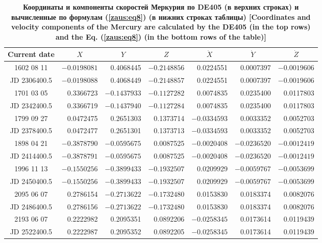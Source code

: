 \begin{table}
\begin{minipage}[t]{160mm}
\caption{\bf Координаты и компоненты скоростей Меркурия по DE405 (в верхних строках) и вычисленные по формулам  (\ref{zaus:eq8}) (в нижних строках таблицы) [Coordinates and velocity components of the Mercury are calculated by the  DE405 (in the top rows) and the Eq. (\ref{zaus:eq8}) (in the bottom rows of the table)]
\vspace{-3mm}}
\begin{tabular}{|c|r|r|r|r|r|r|}
\hline
\footnotesize
\rule{0mm}{12pt}%
Current date & \multicolumn{1}{c|}{\footnotesize $X$}&	\multicolumn{1}{c|}{\footnotesize $Y$}&	\multicolumn{1}{c|}{\footnotesize $Z$}&	\multicolumn{1}{c|}{\footnotesize $\dot{X}$}&	\multicolumn{1}{c|}{\footnotesize $\dot{Y}$}&	\multicolumn{1}{c|}{\footnotesize$\dot{Z}$}\\ \hline
\rule{0mm}{14pt}%
1602 08 11&	$-0.0198081$ &	0.4068445&	$-0.2148856$ &	0.0224551&	0.0007397&	  $-0.0019606$ \\
JD 2306400.5&	$-0.0198088$ &	0.4068449&	$-0.2148857$ &	0.0224551&	0.0007397&	  $-0.0019606$ \\ \hline
1701 03 05&	0.3366723&	$-0.1437933$ &	$-0.1127282$ &	0.0074835&	0.0235400&	   0.0117803 \\
JD 2342400.5&	0.3366719&	$-0.1437940$&	$-0.1127284$&	0.0074835&	0.0235400&	   0.0117803 \\ \hline
1799 09 27&	0.0472475&	0.2651303&	0.1373714&	$-0.0334593$ &	0.0033352&	   0.0052703\\
JD 2378400.5&	0.0472477&	0.2651301&	0.1373713&	$-0.0334593$ &	0.0033352&	   0.0052703\\ \hline
1898 04 21&	$-0.3878790$ &	$-0.0595675$ &	0.0087525&	$-0.0020408$ &	$-0.0236520$ &	  $-0.0012419$\\
JD 2414400.5&	$-0.3878791$&	$-0.0595675$&	0.0087525&	$-0.0020408$ &	$-0.0236520$&	  $-0.0012419$\\ \hline
1996 11 13&	$-0.1550256$ &	$-0.3899433$&	$-0.1932507$ &	0.0209929& 	$-0.0059767$ &	  $-0.0053699$ \\
JD 2450400.5&	$-0.1550256$&	$-0.3899433$&	$-0.1932507$&	0.0209929 &	$-0.0059767$ &	  $-0.0053699$\\ \hline
2095 06 07&	0.2786154&	$-0.2713622$&	$-0.1732480$&	 0.0153830 &	0.0183374 &	  0.0082076 \\
JD 2486400.5&	0.2786156&	$-0.2713622$&	$-0.1732480$&	 0.0153830 &	0.0183374 &	  0.0082076 \\ \hline
2193 06 07&	0.2222982&	0.2095351&	0.0892206&	 $-0.0258345$& 	0.0173614&	  0.0119439 \\
JD 2522400.5&	0.2222987&	0.2095352&	0.0892205&	 $-0.0258345$ &	0.0173614&	  0.0119439 \\ \hline
\end{tabular}
\label{table:zausaev:tabl3}


\end{minipage}
\end{table}




